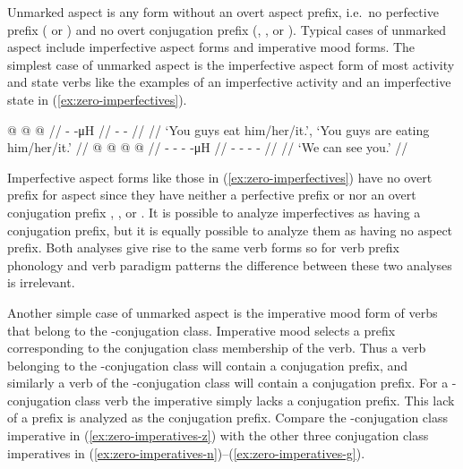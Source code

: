 \documentclass[12pt,letterpaper,landscape,oneside,article]{memoir}
\begin{document}
\begin{multicols}{2}
\noindent
Unmarked aspect is any form without an overt aspect prefix, i.e.\ no perfective prefix ( or ) and no overt conjugation prefix (, , or ).
Typical cases of unmarked aspect include imperfective aspect forms and imperative mood forms.
The simplest case of unmarked aspect is the imperfective aspect form of most activity and state verbs like the examples of an imperfective activity and an imperfective state in (\ref{ex:zero-imperfectives}).

\pex\label{ex:zero-imperfectives}%
\a\label{ex:zero-imperfectives-activity}%
%
\begingl
	\gla	{} @ {} @ {} @ {} //
	\glb	{} -  -μH //
	\glc	{} -  - //
	\gld	{} {} {} {} //
	\glft	‘You guys eat him/her/it.’, ‘You guys are eating him/her/it.’
		//
\endgl
\a\label{ex:zero-imperfectives-state}%
%
\begingl
	\gla	{} @ {} @ {} @ {} @ {} //
	\glb	{}- - -  -μH //
	\glc	{}- - -  - //
	\gld	{} {} {} {} {} {} //
	\glft	‘We can see you.’
		//
\endgl
\xe

Imperfective aspect forms like those in (\ref{ex:zero-imperfectives}) have no overt prefix for aspect since they have neither a perfective prefix  or  nor an overt conjugation prefix , , or .
It is possible to analyze imperfectives as having a  conjugation prefix, but it is equally possible to analyze them as having no aspect prefix.
Both analyses give rise to the same verb forms so for verb prefix phonology and verb paradigm patterns the difference between these two analyses is irrelevant.

Another simple case of unmarked aspect is the imperative mood form of verbs that belong to the -conjugation class.
Imperative mood selects a prefix corresponding to the conjugation class membership of the verb.
Thus a verb belonging to the -conjugation class will contain a  conjugation prefix, and similarly a verb of the -conjugation class will contain a  conjugation prefix.
For a -conjugation class verb the imperative simply lacks a conjugation prefix.
This lack of a prefix is analyzed as the  conjugation prefix.
Compare the -conjugation class imperative in (\ref{ex:zero-imperatives-z}) with the other three conjugation class imperatives in (\ref{ex:zero-imperatives-n})–(\ref{ex:zero-imperatives-g}).


\end{multicols}
\end{document}
